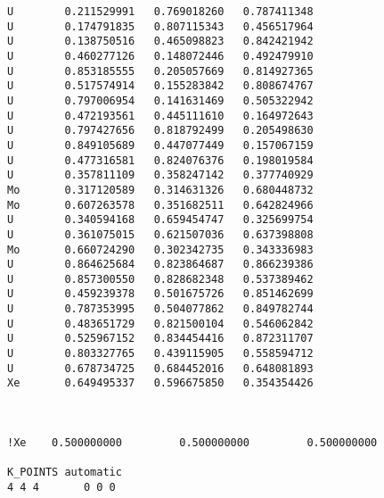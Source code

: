 \begin{lstlisting}
U        0.211529991   0.769018260   0.787411348
U        0.174791835   0.807115343   0.456517964
U        0.138750516   0.465098823   0.842421942
U        0.460277126   0.148072446   0.492479910
U        0.853185555   0.205057669   0.814927365
U        0.517574914   0.155283842   0.808674767
U        0.797006954   0.141631469   0.505322942
U        0.472193561   0.445111610   0.164972643
U        0.797427656   0.818792499   0.205498630
U        0.849105689   0.447077449   0.157067159
U        0.477316581   0.824076376   0.198019584
U        0.357811109   0.358247142   0.377740929
Mo       0.317120589   0.314631326   0.680448732
Mo       0.607263578   0.351682511   0.642824966
U        0.340594168   0.659454747   0.325699754
U        0.361075015   0.621507036   0.637398808
Mo       0.660724290   0.302342735   0.343336983
U        0.864625684   0.823864687   0.866239386
U        0.857300550   0.828682348   0.537389462
U        0.459239378   0.501675726   0.851462699
U        0.787353995   0.504077862   0.849782744
U        0.483651729   0.821500104   0.546062842
U        0.525967152   0.834454416   0.872311707
U        0.803327765   0.439115905   0.558594712
U        0.678734725   0.684452016   0.648081893
Xe       0.649495337   0.596675850   0.354354426



!Xe    0.500000000         0.500000000         0.500000000

K_POINTS automatic
4 4 4       0 0 0
\end{lstlisting}
\pagebreak
